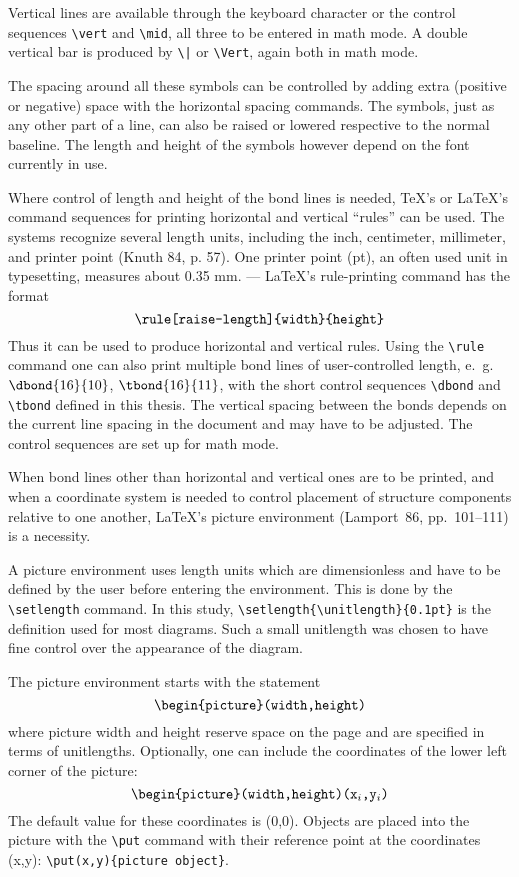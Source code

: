  Vertical lines are available through the keyboard character or the
 control sequences \verb+\vert+ and \verb+\mid+, all three to be
 entered in math mode.
 A double vertical bar is produced by \verb+\|+ or \verb+\Vert+,
 again both in math mode.
 
 The spacing around all these symbols can be controlled by adding
 extra (positive or negative) space with the horizontal spacing
 commands. The symbols, just as any other part of a line, can also
 be raised or lowered respective to the normal baseline. The length
 and height of the symbols however depend on the font currently
 in use.
 
 Where control of length and height of the bond lines is needed,
 \TeX's or \LaTeX's command sequences for printing horizontal and
 vertical ``rules'' can be used.  The systems recognize several
 length units, including the inch, centimeter, millimeter, and
 printer point (Knuth 84, p. 57). One printer point (pt), an often
 used unit in typesetting, measures about 0.35 mm. --- \LaTeX's
 rule-printing command has the format
 $$\hbox{\verb+\rule[raise-length]{width}{height}+}$$
 Thus it can be used to produce horizontal and vertical rules.
 Using the \verb+\rule+ command one can also print multiple
 bond lines of user-controlled length, e.~g.  $\dbond{16}{10} $,
 $\tbond{16}{11} $, with the short control sequences \verb+\dbond+
 and \verb+\tbond+ defined in this thesis. The vertical spacing
 between the bonds depends on the current line spacing in the
 document and may have to be adjusted. The control sequences
 are set up for math mode.
 
 When bond lines other than horizontal and vertical ones are to
 be printed, and when a coordinate system is needed to control
 placement of structure components relative to one another,
 \LaTeX's picture environment (Lamport~86, pp.~101--111) is a
 necessity.
 
 A picture environment uses length units which are dimensionless
 and have to be defined by the user before entering the
 environment. This is done by the \verb+\setlength+ command.
 In this study, \verb+\setlength{\unitlength}{0.1pt}+
 is the definition used for most diagrams. Such a small
 unitlength was chosen to have fine control over the appearance
 of the diagram.
 
 The picture environment starts with the statement
 $$\hbox{\verb+\begin{picture}(width,height)+}$$
 where picture width and height reserve space on the page
 and are specified in terms of unitlengths. Optionally, one
 can include the coordinates of the lower left corner of the
 picture:
 $$\hbox{\verb+\begin{picture}(width,height)(x+$_i$\verb+,y+$_i$\verb+)+}$$
 The default value for these coordinates is (0,0).
 Objects are placed into the picture with the \verb+\put+
 command with their reference point at the coordinates (x,y):
 \verb+\put(x,y){picture object}+.
 
